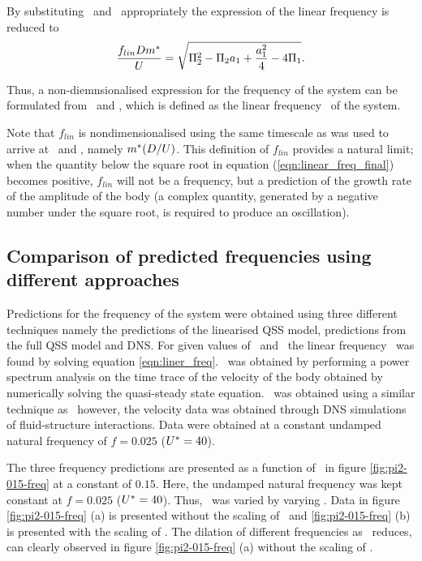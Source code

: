By substituting \massstiff\ and \massdamp\ appropriately the expression of the linear frequency is reduced to   
\begin{equation}
\label{eqn:linear_freq_final-1}
\frac{f_{lin}Dm^{*}}{U} = \sqrt{\Pi_2^2 - \Pi_2a_1 + \frac{a_1^2}{4} - 4\Pi_1}.
\end{equation}

Thus, a non-diemnsionalised expression for the frequency of the system can be formulated from \massstiff\ and \massdamp, which is defined as the linear frequency  \freqlin\ of the system.

Note that $f_{lin}$ is nondimensionalised using the same timescale as was used to arrive at \massstiff\ and \massdamp, namely $m^{*}(D/U)$. This definition of $f_{lin}$ provides a natural limit; when the quantity below the square root in equation (\ref{eqn:linear_freq_final}) becomes positive, $f_{lin}$ will not be a frequency, but a prediction of the growth rate of the amplitude of the body (a complex quantity, generated by a negative number under the square root, is required to produce an oscillation).

\subsection{Comparison of predicted frequencies using different approaches}

Predictions for the frequency of the system were obtained using three different techniques namely the predictions of the linearised QSS model, predictions from the full QSS model and DNS. For given values of \massstiff\ and \massdamp\, the linear frequency \freqlin\ was found by solving equation \ref{eqn:liner_freq}. \freqqss\ was obtained by performing a power spectrum analysis on the time trace of the velocity of the body  obtained by numerically solving the quasi-steady state equation. \freqdns\ was obtained using a similar technique as \freqqss\ however, the velocity data was obtained through DNS simulations of fluid-structure interactions. Data were obtained at a constant undamped natural frequency of $f=0.025$ ($U^{*}=40$).



The three frequency predictions are presented as a function of  \massstiff\ in figure \ref{fig:pi2-015-freq} at a constant \massdamp of $0.15$. Here, the undamped natural frequency was kept constant at $f=0.025$ ($U^{*}=40$). Thus, \massstiff\ was varied by varying \mstar. Data in figure \ref{fig:pi2-015-freq} (a) is presented without the scaling of \mstar\ and \ref{fig:pi2-015-freq} (b) is presented with the scaling of \mstar. The dilation of different frequencies as \massstiff\ reduces, can clearly observed in figure \ref{fig:pi2-015-freq} (a) without the scaling of \mstar.

